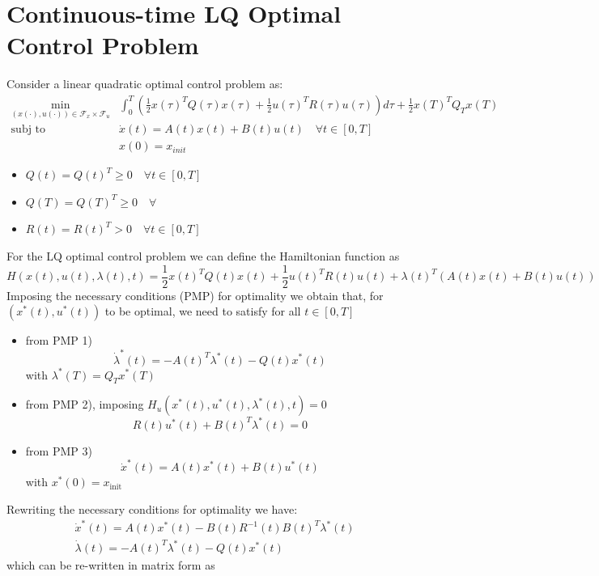 \documentclass[openany]{book}
\theoremstyle{definition}
\theoremstyle{remark}
\begin{document}
\section{Continuous-time LQ Optimal Control Problem}
Consider a linear quadratic optimal control problem as: 
\begin{align*}
    \min_{(x(\cdot),u(\cdot))\in\mathcal{F}_x\times\mathcal{F}_u} &\displaystyle\int_{0}^{T} \left(\displaystyle\frac{1}{2}x(\tau)^TQ(\tau)x(\tau) + \displaystyle\frac{1}{2}u(\tau)^TR(\tau)u(\tau)\right)d\tau+\displaystyle\frac{1}{2} x(T)^TQ_Tx(T)\\
    \text{subj to } & \dot{x}(t) = A(t)x(t) + B(t)u(t) \quad \forall t \in [0,T]\\
     & x(0) = x_{init}
\end{align*}
\begin{itemize}
    \item $Q(t)=Q(t)^T \geq 0 \quad \forall t\in[0,T]$
    \item $Q(T)=Q(T)^T \geq 0 \quad \forall $
    \item $R(t)=R(t)^T > 0 \quad \forall t\in[0,T]$
\end{itemize}
For the LQ optimal control problem we can define the Hamiltonian function as 
\[
    H(x(t),u(t),\lambda(t),t) = \displaystyle\frac{1}{2}x(t)^TQ(t)x(t) + \displaystyle\frac{1}{2}u(t)^TR(t)u(t) + \lambda(t)^T(A(t)x(t)+B(t)u(t))
\]
Imposing the necessary conditions (PMP) for optimality we obtain that, for $(x^*(t),u^*(t))$ to be optimal, we need to satisfy for all $t\in[0,T]$
\begin{itemize}
    \item from PMP 1) 
        \[
            \dot{\lambda}^*(t) = -A(t)^T\lambda^*(t)-Q(t)x^*(t)
        \]
        with $\lambda^*(T) = Q_Tx^*(T)$
    \item from PMP 2), imposing $H_u(x^*(t),u^*(t),\lambda^*(t),t) = 0$
        \[
            R(t)u^*(t)+B(t)^T\lambda^*(t) = 0
        \]
    \item from PMP 3)
        \[
            \dot{x}^*(t) = A(t)x^*(t) + B(t)u^*(t)
        \]
        with $x^*(0) = x_{\text{init}}$
\end{itemize}
Rewriting the necessary conditions for optimality we have:
\begin{align*}
    & \dot{x}^*(t) = A(t)x^*(t)-B(t)R^{-1}(t)B(t)^T\lambda^*(t)\\
    & \dot{\lambda}(t) = -A(t)^T\lambda^*(t)-Q(t)x^*(t)
\end{align*}
which can be re-written in matrix form as 
\end{document}

